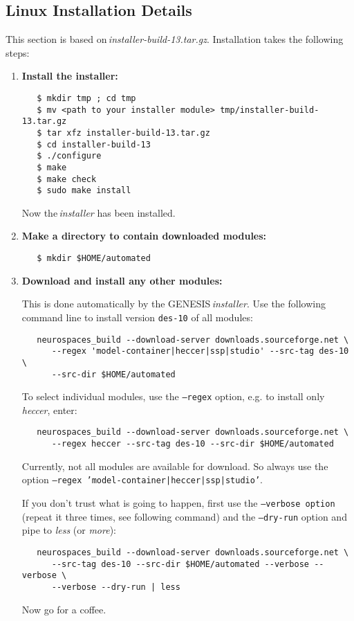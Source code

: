 \documentclass[12pt]{article}
\begin{document}
\subsection*{Linux Installation Details}

This section is based on\,{\it installer-build-13.tar.gz}. Installation takes the following steps:

\begin{enumerate}
\item {\bf Install the installer:}
\begin{verbatim}
   $ mkdir tmp ; cd tmp
   $ mv <path to your installer module> tmp/installer-build-13.tar.gz
   $ tar xfz installer-build-13.tar.gz
   $ cd installer-build-13
   $ ./configure
   $ make
   $ make check 
   $ sudo make install 
\end{verbatim}
Now the\,{\it installer} has been installed. 

\item {\bf Make a directory to contain downloaded modules:}
\begin{verbatim}
   $ mkdir $HOME/automated
\end{verbatim}

\item {\bf Download and install any other modules:}

This is done automatically by the GENESIS\,{\it installer}. Use the following command line to install version {\tt des-10} of all modules:
\begin{verbatim}
   neurospaces_build --download-server downloads.sourceforge.net \
      --regex 'model-container|heccer|ssp|studio' --src-tag des-10 \
      --src-dir $HOME/automated
\end{verbatim}
To select individual modules, use the {\tt --regex} option, e.g. to install only {\it heccer}, enter:
\begin{verbatim}
   neurospaces_build --download-server downloads.sourceforge.net \
      --regex heccer --src-tag des-10 --src-dir $HOME/automated
\end{verbatim}
Currently, not all modules are available for download. So always use the option {\tt --regex 'model-container|heccer|ssp|studio'}.

If you don't trust what is going to happen, first use the {\tt --verbose option} (repeat it three times, see following command) and the {\tt --dry-run} option and pipe to {\it less} (or {\it more}):
\begin{verbatim}
   neurospaces_build --download-server downloads.sourceforge.net \
      --src-tag des-10 --src-dir $HOME/automated --verbose --verbose \
      --verbose --dry-run | less
\end{verbatim}
Now go for a coffee.  


\end{enumerate}
\end{document}
